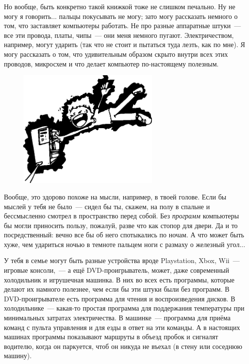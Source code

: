 
Но вообще, быть конкретно такой книжкой тоже не слишком печально. Ну не могу я говорить... пальцы покусывать не могу; зато могу рассказать немного о том, что заставляет компьютеры работать. Не про разные аппаратные штуки — все эти провода, платы, чипы — они меня немного пугают. Электричеством, например, могут ударить (так что не стоит и пытаться туда лезть, как по мне). Я могу рассказать о том, что удивительным образом скрыто внутри всех этих проводов, микросхем и что делает компьютер по-настоящему полезным.

\begin{figure}
  \begin{center}
\includegraphics*[width=70mm]{../en/electrocute.eps}
  \end{center}
\end{figure}

Вообще, это здорово похоже на мысли, например, в твоей голове. Если бы мыслей у тебя не было — сидел бы ты, скажем, на полу в спальне и бессмысленно смотрел в пространство перед собой. Без \emph{программ} компьютеры бы могли приносить пользу, пожалуй, разве что как стопор для двери. Да и то посредственный: вечно все бы об него спотыкались по ночам. А что может быть хуже, чем удариться ночью в темноте пальцем ноги с размаху о железный угол...


У тебя в семье могут быть разные устройства вроде Playstation, Xbox, Wii — игровые консоли, — а ещё DVD-проигрыватель, может, даже современный холодильник и игрушечная машинка. В них во всех есть программы, которые делают их намного полезнее, чем если бы эти штуки были без программ. В DVD-проигрывателе есть программа для чтения и воспроизведения дисков. В холодильнике — какая-то простая программа для поддержания температуры при минимальных затратах электричества. В машинке — программа для приёма команд с пульта управления и для езды в ответ на эти команды. А в настоящих машинах программы показывают маршруты в объезд пробок и сигналят водителю, когда он паркуется, чтоб он никуда не въехал (в стену или соседнюю машину).

